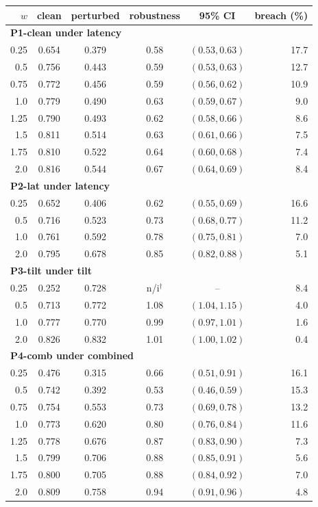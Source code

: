 \begin{tabular}{@{}r c c c c r@{}}
\toprule
$w$ & clean & perturbed & robustness & 95\% CI & breach (\%) \\
\midrule
\multicolumn{6}{l}{\textbf{P1-clean under latency}} \\
0.25 & 0.654 & 0.379 & 0.58 & $(0.53,0.63)$ & 17.7 \\
0.5 & 0.756 & 0.443 & 0.59 & $(0.53,0.63)$ & 12.7 \\
0.75 & 0.772 & 0.456 & 0.59 & $(0.56,0.62)$ & 10.9 \\
1.0 & 0.779 & 0.490 & 0.63 & $(0.59,0.67)$ & 9.0 \\
1.25 & 0.790 & 0.493 & 0.62 & $(0.58,0.66)$ & 8.6 \\
1.5 & 0.811 & 0.514 & 0.63 & $(0.61,0.66)$ & 7.5 \\
1.75 & 0.810 & 0.522 & 0.64 & $(0.60,0.68)$ & 7.4 \\
2.0 & 0.816 & 0.544 & 0.67 & $(0.64,0.69)$ & 8.4 \\
\midrule
\multicolumn{6}{l}{\textbf{P2-lat under latency}} \\
0.25 & 0.652 & 0.406 & 0.62 & $(0.55,0.69)$ & 16.6 \\
0.5 & 0.716 & 0.523 & 0.73 & $(0.68,0.77)$ & 11.2 \\
1.0 & 0.761 & 0.592 & 0.78 & $(0.75,0.81)$ & 7.0 \\
2.0 & 0.795 & 0.678 & 0.85 & $(0.82,0.88)$ & 5.1 \\
\midrule
\multicolumn{6}{l}{\textbf{P3-tilt under tilt}} \\
0.25 & 0.252 & 0.728 & n/i$^\dagger$ & -- & 8.4 \\
0.5 & 0.713 & 0.772 & 1.08 & $(1.04,1.15)$ & 4.0 \\
1.0 & 0.777 & 0.770 & 0.99 & $(0.97,1.01)$ & 1.6 \\
2.0 & 0.826 & 0.832 & 1.01 & $(1.00,1.02)$ & 0.4 \\
\midrule
\multicolumn{6}{l}{\textbf{P4-comb under combined}} \\
0.25 & 0.476 & 0.315 & 0.66 & $(0.51,0.91)$ & 16.1 \\
0.5 & 0.742 & 0.392 & 0.53 & $(0.46,0.59)$ & 15.3 \\
0.75 & 0.754 & 0.553 & 0.73 & $(0.69,0.78)$ & 13.2 \\
1.0 & 0.773 & 0.620 & 0.80 & $(0.76,0.84)$ & 11.6 \\
1.25 & 0.778 & 0.676 & 0.87 & $(0.83,0.90)$ & 7.3 \\
1.5 & 0.799 & 0.706 & 0.88 & $(0.85,0.91)$ & 5.6 \\
1.75 & 0.800 & 0.705 & 0.88 & $(0.84,0.92)$ & 7.0 \\
2.0 & 0.809 & 0.758 & 0.94 & $(0.91,0.96)$ & 4.8 \\
\bottomrule
\end{tabular}
